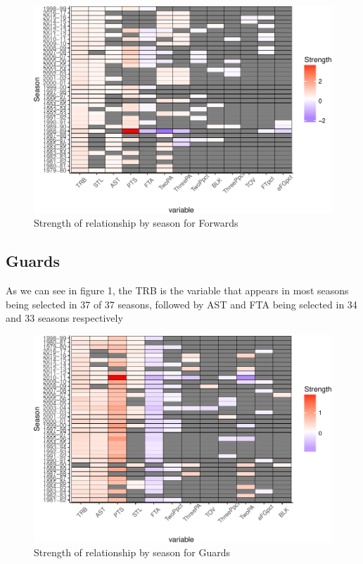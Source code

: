\documentclass[]{elsarticle} %
\makeatletter
\def\maxwidth{\ifdim\Gin@nat@width>\linewidth\linewidth
\else\Gin@nat@width\fi}
\let\Oldincludegraphics\includegraphics
\renewcommand{\includegraphics}[1]{\Oldincludegraphics[width=\maxwidth]{#1}}
\makeatother
\begin{document}
\begin{figure}[htbp]
\centering
\includegraphics{Coaching_Selection_files/figure-latex/unnamed-chunk-9-1.pdf}
\caption{Strength of relationship by season for Forwards}
\end{figure}

\subsection{Guards}\label{guards}

As we can see in figure 1, the TRB is the variable that appears in most
seasons being selected in 37 of 37 seasons, followed by AST and FTA
being selected in 34 and 33 seasons respectively

\begin{figure}[htbp]
\centering
\includegraphics{Coaching_Selection_files/figure-latex/unnamed-chunk-12-1.pdf}
\caption{Strength of relationship by season for Guards}
\end{figure}
\end{document}
